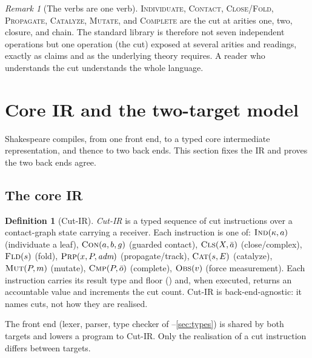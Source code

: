\documentclass[11pt,a4paper]{article}
\theoremstyle{thmstyle}
\theoremstyle{definition}
\newtheorem{definition}[theorem]{Definition}
\theoremstyle{remark}
\newtheorem{remark}[theorem]{Remark}
\begin{document}
\begin{remark}[The verbs are one verb]
\label{rem:one-verb}
\textsc{Individuate}, \textsc{Contact}, \textsc{Close}/\textsc{Fold},
\textsc{Propagate}, \textsc{Catalyze}, \textsc{Mutate}, and
\textsc{Complete} are the cut at arities one, two, closure, and chain. The
standard library is therefore not seven independent operations but one
operation (the cut) exposed at several arities and readings, exactly as
 claims and as the underlying theory requires. A reader who
understands the cut understands the whole language.
\end{remark}

\section{Core IR and the two-target model}
\label{sec:ir}

Shakespeare compiles, from one front end, to a typed core intermediate
representation, and thence to two back ends. This section fixes the IR and
proves the two back ends agree.

\subsection{The core IR}

\begin{definition}[Cut-IR]
\label{def:ir}
\emph{Cut-IR} is a typed sequence of cut instructions over a contact-graph
state carrying a receiver. Each instruction is one of: $\textsc{Ind}(\kappa,a)$
(individuate a leaf), $\textsc{Con}(a,b,g)$ (guarded contact),
$\textsc{Cls}(X,\bar a)$ (close/complex), $\textsc{Fld}(s)$ (fold),
$\textsc{Prp}(x,P,\textit{adm})$ (propagate/track),
$\textsc{Cat}(s,E)$ (catalyze), $\textsc{Mut}(P,m)$ (mutate),
$\textsc{Cmp}(P,\bar o)$ (complete), $\textsc{Obs}(v)$ (force measurement).
Each instruction carries its result type and floor () and,
when executed, returns an accountable value and increments the cut count.
Cut-IR is back-end-agnostic: it names cuts, not how they are realised.
\end{definition}

The front end (lexer, parser, type checker of
--\ref{sec:types}) is shared by both targets and lowers a
program to Cut-IR. Only the realisation of a cut instruction differs
between targets.
\end{document}
